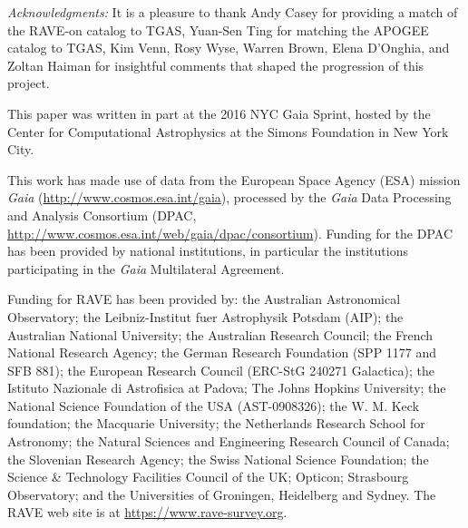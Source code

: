 \documentclass[apj, twocolappendix, numberedappendix, appendixfloats]{emulateapj}
\begin{document}


\vspace{0.5cm}
\emph{Acknowledgments:}
It is a pleasure to thank Andy Casey for providing a match of the RAVE-on catalog to TGAS, Yuan-Sen Ting for matching the APOGEE catalog to TGAS, Kim Venn, Rosy Wyse, Warren Brown, Elena D'Onghia, and Zoltan Haiman for insightful comments that shaped the progression of this project.


This paper was written in part at the 2016 NYC Gaia Sprint, hosted by the Center for Computational Astrophysics at the Simons Foundation in New York City.

This work has made use of data from the European Space Agency (ESA) mission {\it Gaia} (\url{http://www.cosmos.esa.int/gaia}), processed by the {\it Gaia} Data Processing and Analysis Consortium (DPAC, \url{http://www.cosmos.esa.int/web/gaia/dpac/consortium}). Funding for the DPAC has been provided by national institutions, in particular the institutions participating in the {\it Gaia} Multilateral Agreement.

Funding for RAVE has been provided by: the Australian Astronomical Observatory; the Leibniz-Institut fuer Astrophysik Potsdam (AIP); the Australian National University; the Australian Research Council; the French National Research Agency; the German Research Foundation (SPP 1177 and SFB 881); the European Research Council (ERC-StG 240271 Galactica); the Istituto Nazionale di Astrofisica at Padova; The Johns Hopkins University; the National Science Foundation of the USA (AST-0908326); the W. M. Keck foundation; the Macquarie University; the Netherlands Research School for Astronomy; the Natural Sciences and Engineering Research Council of Canada; the Slovenian Research Agency; the Swiss National Science Foundation; the Science \& Technology Facilities Council of the UK; Opticon; Strasbourg Observatory; and the Universities of Groningen, Heidelberg and Sydney.
The RAVE web site is at \url{https://www.rave-survey.org}.
\end{document}
